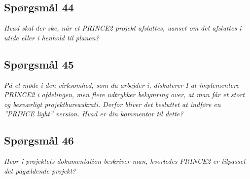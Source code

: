 \documentclass[12pt,twoside]{article}
\begin{document}
    \subsection{Sp\o{}rgsm\r{a}l 44}
    \textit{Hvad skal der ske, når et PRINCE2 projekt afsluttes, uanset om det afsluttes i utide eller i henhold til planen?}
    \subsection{Sp\o{}rgsm\r{a}l 45}
    \textit{På et møde i den virksomhed, som du arbejder i, diskuterer I at implementere PRINCE2 i afdelingen, men flere udtrykker bekymring over, at man får et stort og besværligt projektbureaukrati. Derfor bliver det besluttet at indføre en ”PRINCE light” version. Hvad er din kommentar til dette?}
    \subsection{Sp\o{}rgsm\r{a}l 46}
    \textit{Hvor i projektets dokumentation beskriver man, hvorledes PRINCE2 er tilpasset det pågældende projekt?}
\end{document}
